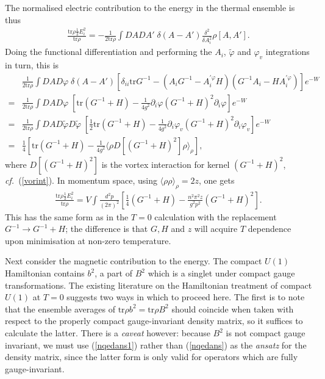 \documentclass[a4paper,a4paper]{article}
\begin{document}
The normalised electric contribution to the energy in the thermal ensemble is thus
\begin{gather}
\frac{\mathrm{tr} \rho \frac{1}{2} E_{i}^{2}}{\mathrm{tr} \rho} =  - \frac{1}{2 \mathrm{tr} \rho} \int DA DA' \;
\delta (A - A') \frac{\delta^2}{\delta A_{i}^{2}} \rho [A,A'].
\end{gather}
Doing the functional differentiation and performing the $A_{i}$, $\tilde{\varphi}$ and $\varphi_v$ integrations in turn, this is
\begin{align}
& \frac{1}{2 \mathrm{tr} \rho} \int DA D\varphi \;
\delta (A - A') \left[\delta_{ii} \mathrm{tr} G^{-1} - (A_i G^{-1}- A_{i}^{' \varphi} H )(G^{-1} A_i - H A_{i}^{' \varphi}) \right] 
e^{-W} \nonumber \\
= &\frac{1}{2 \mathrm{tr} \rho} \int DA D\varphi \;
\left[ \mathrm{tr} (G^{-1} + H) - \frac{1}{4g^2} \partial_i \varphi (G^{-1} + H )^2 \partial_i \varphi \right] 
e^{-W} \nonumber \\
= &\frac{1}{2 \mathrm{tr} \rho}  \int DA D\tilde{\varphi} D \tilde{\varphi} \; 
\left[ \frac{1}{2} \mathrm{tr}(G^{-1} + H) - \frac{1}{4g^2} \partial_i \varphi_v (G^{-1} + H )^2 \partial_i \varphi_v \right] 
e^{-W} \nonumber \\
= &\frac{1}{4}
\left[\mathrm{tr} (G^{-1} + H) - \frac{1}{4g^2} \langle \rho D[ (G^{-1} + H )^2 ]\rho \rangle_{\rho} \right],
\end{align}
where $D[ (G^{-1} + H )^2 ]$ is the vortex interaction for kernel $(G^{-1} + H )^2$, \emph{cf.\ }(\ref{vorint}).
In momentum space, using $\langle \rho \rho \rangle_{\rho} = 2z$, one gets
\begin{gather} \label{elec}
\frac{\mathrm{tr} \rho \frac{1}{2} E_{i}^{2}}{\mathrm{tr} \rho} =
V \int \frac{d^2 p}{(2 \pi)^2} \left[ \frac{1}{4}(G^{-1} + H) - \frac{ n^2 \pi^2 z}{g^2 p^2} (G^{-1} + H )^2 \right].
\end{gather}
This has the same form as in the $T=0$ calculation with the replacement $G^{-1} \rightarrow G^{-1}+H$; the difference
is that $G,H$ and $z$ will acquire $T$ dependence upon minimisation at non-zero temperature. 

Next consider the magnetic contribution to the energy. The compact $U(1)$ Hamiltonian contains $b^2$, a part of $B^2$ which is
a singlet under compact gauge transformations.
The existing literature on the Hamiltonian treatment of compact $U(1)$ at $T=0$ suggests two ways in which to
proceed here. The first \cite{Kogan:1995vb} is to note that
the ensemble averages of $\mathrm{tr} \rho b^2 = \mathrm{tr} \rho B^2$ should coincide
when taken with respect to the properly compact gauge-invariant density matrix, so it suffices to calculate the latter. 
There is a \emph{caveat} however: 
because $B^2$ is not compact gauge invariant, we must use (\ref{nqedans1}) rather than (\ref{nqedans}) as the \emph{ansatz}
for the density matrix, since the latter form is only valid for operators which are fully gauge-invariant.
\end{document}
